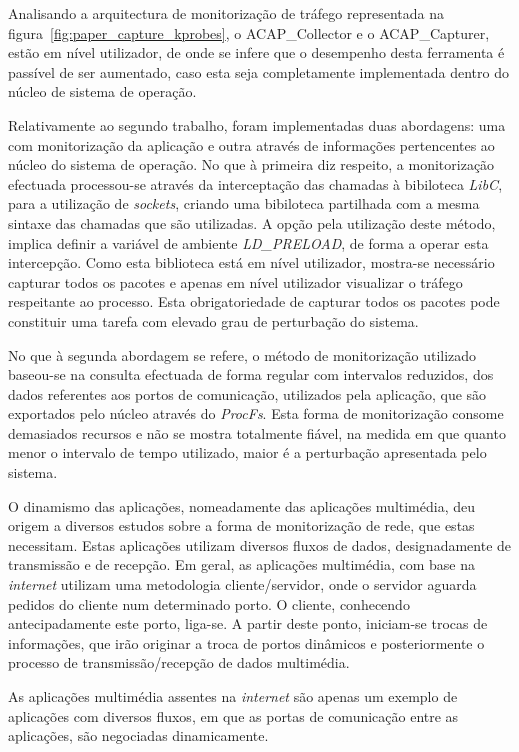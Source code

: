 Analisando a arquitectura de monitorização de tráfego representada na figura~\ref{fig:paper_capture_kprobes}, o ACAP\_Collector e o ACAP\_Capturer, estão em nível utilizador, de onde se infere que o desempenho desta ferramenta é passível de ser aumentado, caso esta seja completamente implementada dentro do núcleo de sistema de operação.

Relativamente ao segundo trabalho, foram implementadas duas abordagens: uma com monitorização da aplicação e outra através de informações pertencentes ao núcleo do sistema de operação.
No que à primeira diz respeito, a monitorização efectuada processou-se através da interceptação das chamadas à bibiloteca \textit{LibC}, para a utilização de \textit{sockets}, criando uma bibiloteca partilhada com a mesma sintaxe das chamadas que são utilizadas.
A opção pela utilização deste método, implica definir a variável de ambiente \textit{LD\_PRELOAD}, de forma a operar esta intercepção.
Como esta biblioteca está em nível utilizador, mostra-se necessário capturar todos os pacotes e apenas em nível utilizador visualizar o tráfego respeitante ao processo.
Esta obrigatoriedade de capturar todos os pacotes pode constituir uma tarefa com elevado grau de perturbação do sistema.

No que à segunda abordagem se refere, o método de monitorização utilizado baseou-se na consulta efectuada de forma regular com intervalos reduzidos, dos dados referentes aos portos de comunicação, utilizados pela aplicação, que são exportados pelo núcleo através do \textit{ProcFs}.
Esta forma de monitorização consome demasiados recursos e não se mostra totalmente fiável, na medida em que quanto menor o intervalo de tempo utilizado, maior é a perturbação apresentada pelo sistema.

O dinamismo das aplicações, nomeadamente das aplicações multimédia, deu origem a diversos estudos sobre a forma de monitorização de rede, que estas necessitam.
Estas aplicações utilizam diversos fluxos de dados, designadamente de transmissão e de recepção.
Em geral, as aplicações multimédia, com base na \textit{internet} utilizam uma metodologia cliente/servidor, onde o servidor aguarda pedidos do cliente num determinado porto.
O cliente, conhecendo antecipadamente este porto, liga-se.
A partir deste ponto, iniciam-se trocas de informações, que irão originar a troca de portos dinâmicos e posteriormente o processo de transmissão/recepção de dados multimédia.

As aplicações multimédia assentes na \textit{internet} são apenas um exemplo de aplicações com diversos fluxos, em que as portas de comunicação entre as aplicações, são negociadas dinamicamente.

